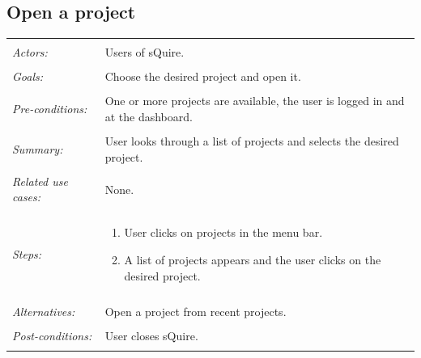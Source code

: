 \documentclass[11pt]{report}
\begin{document}
\subsection{Open a project}
\begin{tabular}{ p{2cm} p{12cm} }
 \hline
 \\
 \textit{Actors:} & Users of sQuire. \\ 
 \\
 \textit{Goals:} & Choose the desired project and open it. \\
 \\
 \textit{Pre-conditions:} & One or more projects are available, the user is logged in and at the dashboard. \\
 \\
 \textit{Summary:} & User looks through a list of projects and selects the desired project. \\ 
 \\
 \textit{Related use cases:} & None. \\ 
 \\
 \textit{Steps:} & \begin{enumerate}
  \item User clicks on projects in the menu bar.
  \item A list of projects appears and the user clicks on the desired project.
 \end{enumerate} \\
 \\
 \textit{Alternatives:} & Open a project from recent projects. \\
 \\
 \textit{Post-conditions:} & User closes sQuire. \\
 \\
\hline
\end{tabular}
\end{document}

